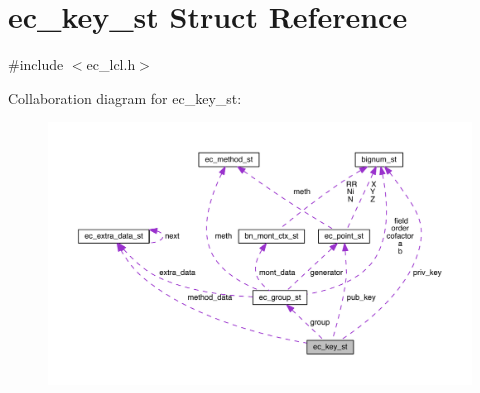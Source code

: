 \hypertarget{structec__key__st}{}\section{ec\+\_\+key\+\_\+st Struct Reference}
\label{structec__key__st}


{\ttfamily \#include $<$ec\+\_\+lcl.\+h$>$}



Collaboration diagram for ec\+\_\+key\+\_\+st\+:\nopagebreak
\begin{figure}[H]
\begin{center}
\leavevmode
\includegraphics[width=350pt]{structec__key__st__coll__graph}
\end{center}
\end{figure}
